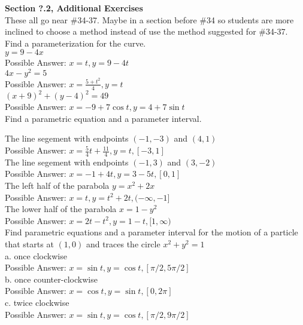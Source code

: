 \documentclass[11pt]{report}
\begin{document}
\textbf{Section ?.2, Additional Exercises}\\
These all go near \#34-37. Maybe in a section before \#34 so students are more inclined to choose a method instead of use the method suggested for \#34-37.\\

Find a parameterization for the curve.\\

$y=9-4x$\\
Possible Answer: $x=t, y=9-4t$\\

$4x-y^2=5$\\
Possible Answer: $x=\frac{5+t^2}{4}, y=t$\\

$(x+9)^2 + (y-4)^2 =49$\\
Possible Answer: $x=-9+7\cos t, y=4+7\sin t$\\

Find a parametric equation and a parameter interval.

The line segement with endpoints $(-1, -3)$ and $(4,1)$\\
Possible Answer: $x=\frac{5}{4}t+\frac{11}{4}, y=t, [-3,1]$\\

The line segement with endpoints $(-1, 3)$ and $(3,-2)$\\
Possible Answer: $x=-1+4t, y=3-5t, [0,1]$\\

The left half of the parabola $y=x^2 + 2x$\\
Possible Answer: $x=t, y=t^2+2t, (-\infty,-1]$\\

The lower half of the parabola $x=1-y^2$\\
Possible Answer: $x=2t-t^2, y=1-t, [1,\infty)$\\

Find parametric equations and a parameter interval for the motion of a particle that starts at $(1, 0)$ and traces the circle $x^2 + y^2 =1$\\
a. once clockwise\\
Possible Answer: $x=\sin t, y=\cos t, [\pi/2, 5\pi/2]$\\ 

b. once counter-clockwise\\
Possible Answer: $x=\cos t, y=\sin t, [0, 2\pi]$\\ 

c. twice clockwise\\
Possible Answer: $x=\sin t, y=\cos t, [\pi/2, 9\pi/2]$\\ 
\end{document}
